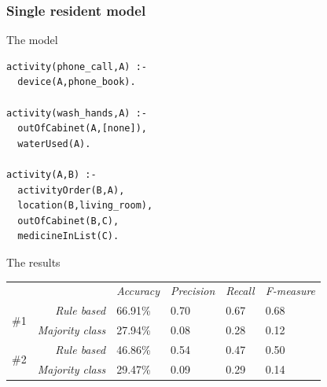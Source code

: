 \documentclass[10pt]{beamer}
\begin{document}
\begin{frame}
  \frametitle{Single resident model}

  \begin{block}{The model}
\begin{verbatim}
activity(phone_call,A) :-
  device(A,phone_book).

activity(wash_hands,A) :-
  outOfCabinet(A,[none]),
  waterUsed(A).

activity(A,B) :-
  activityOrder(B,A),
  location(B,living_room),
  outOfCabinet(B,C),
  medicineInList(C).
\end{verbatim}
  \end{block}

  \begin{block}{The results}
\begin{tabular}{ c r | l l l l }
 & & \emph{Accuracy} & \emph{Precision} & \emph{Recall} & \emph{F-measure}\\
\cline{2-6}
\multirow{2}{*}{\#1}
& \emph{Rule based} & 66.91\% & 0.70 & 0.67 & 0.68\\
& \emph{Majority class} & 27.94\% & 0.08 & 0.28 & 0.12\\
\cline{2-6}
\multirow{2}{*}{\#2}
& \emph{Rule based} & 46.86\% & 0.54 & 0.47 & 0.50\\
& \emph{Majority class} & 29.47\% & 0.09 & 0.29 & 0.14\\
\end{tabular}
  \end{block}

\end{frame} 
\end{document}
